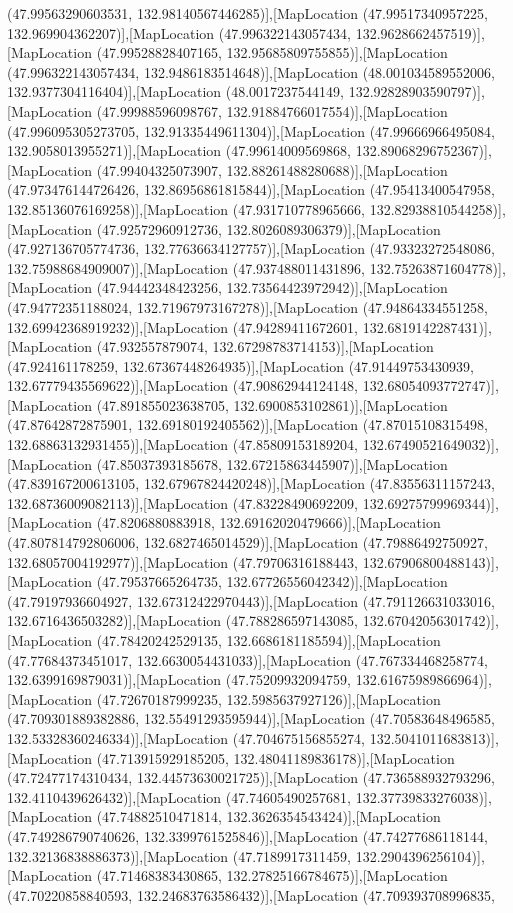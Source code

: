 (47.99563290603531, 132.98140567446285)],[MapLocation (47.99517340957225, 132.969904362207)],[MapLocation (47.996322143057434, 132.9628662457519)],[MapLocation (47.99528828407165, 132.95685809755855)],[MapLocation (47.996322143057434, 132.9486183514648)],[MapLocation (48.001034589552006, 132.9377304116404)],[MapLocation (48.0017237544149, 132.92828903590797)],[MapLocation (47.99988596098767, 132.91884766017554)],[MapLocation (47.996095305273705, 132.91335449611304)],[MapLocation (47.99666966495084, 132.9058013955271)],[MapLocation (47.99614009569868, 132.89068296752367)],[MapLocation (47.99404325073907, 132.88261488280688)],[MapLocation (47.973476144726426, 132.86956861815844)],[MapLocation (47.95413400547958, 132.85136076169258)],[MapLocation (47.931710778965666, 132.82938810544258)],[MapLocation (47.92572960912736, 132.8026089306379)],[MapLocation (47.927136705774736, 132.77636634127757)],[MapLocation (47.93323272548086, 132.75988684909007)],[MapLocation (47.937488011431896, 132.75263871604778)],[MapLocation (47.94442348423256, 132.73564423972942)],[MapLocation (47.94772351188024, 132.71967973167278)],[MapLocation (47.94864334551258, 132.69942368919232)],[MapLocation (47.94289411672601, 132.6819142287431)],[MapLocation (47.932557879074, 132.67298783714153)],[MapLocation (47.924161178259, 132.67367448264935)],[MapLocation (47.91449753430939, 132.67779435569622)],[MapLocation (47.90862944124148, 132.68054093772747)],[MapLocation (47.891855023638705, 132.6900853102861)],[MapLocation (47.87642872875901, 132.69180192405562)],[MapLocation (47.87015108315498, 132.68863132931455)],[MapLocation (47.85809153189204, 132.67490521649032)],[MapLocation (47.85037393185678, 132.67215863445907)],[MapLocation (47.839167200613105, 132.67967824420248)],[MapLocation (47.83556311157243, 132.68736009082113)],[MapLocation (47.83228490692209, 132.69275799969344)],[MapLocation (47.8206880883918, 132.69162020479666)],[MapLocation (47.807814792806006, 132.6827465014529)],[MapLocation (47.79886492750927, 132.68057004192977)],[MapLocation (47.79706316188443, 132.67906800488143)],[MapLocation (47.79537665264735, 132.67726556042342)],[MapLocation (47.79197936604927, 132.67312422970443)],[MapLocation (47.791126631033016, 132.6716436503282)],[MapLocation (47.788286597143085, 132.67042056301742)],[MapLocation (47.78420242529135, 132.6686181185594)],[MapLocation (47.77684373451017, 132.6630054431033)],[MapLocation (47.767334468258774, 132.6399169879031)],[MapLocation (47.75209932094759, 132.61675989866964)],[MapLocation (47.72670187999235, 132.5985637927126)],[MapLocation (47.709301889382886, 132.55491293595944)],[MapLocation (47.70583648496585, 132.53328360246334)],[MapLocation (47.704675156855274, 132.5041011683813)],[MapLocation (47.713915929185205, 132.48041189836178)],[MapLocation (47.72477174310434, 132.44573630021725)],[MapLocation (47.736588932793296, 132.4110439626432)],[MapLocation (47.74605490257681, 132.37739833276038)],[MapLocation (47.74882510471814, 132.3626354543424)],[MapLocation (47.749286790740626, 132.3399761525846)],[MapLocation (47.74277686118144, 132.32136838886373)],[MapLocation (47.7189917311459, 132.2904396256104)],[MapLocation (47.71468383430865, 132.27825166784675)],[MapLocation (47.70220858840593, 132.24683763586432)],[MapLocation (47.709393708996835, 